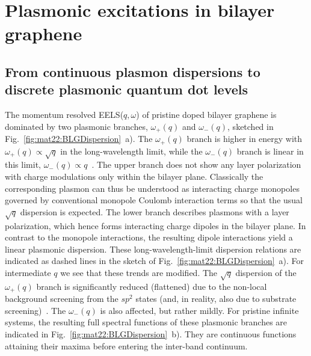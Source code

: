 
\section{Plasmonic excitations in bilayer graphene}

\subsection{From continuous plasmon dispersions to discrete plasmonic quantum dot levels}\label{sec:mat22:from-continuous-plasmon}
        
The momentum resolved EELS($q, \omega$) of pristine doped bilayer graphene is dominated by two plasmonic branches, $\omega_+(q)$ and $\omega_-(q)$, sketched in Fig.~\ref{fig:mat22:BLGDispersion}~a). The $\omega_+(q)$ branch is higher in energy with $\omega_+(q) \propto \sqrt{q}$ in the long-wavelength limit, while the $\omega_-(q)$ branch is linear in this limit, $\omega_-(q) \propto q$~\cite{hwang_dielectric_2007,hwang_plasmon_2009,roldan_dielectric_2013}. The upper branch does not show any layer polarization with charge modulations only within the bilayer plane. Classically the corresponding plasmon can thus be understood as interacting charge monopoles governed by conventional monopole Coulomb interaction terms so that the usual $\sqrt{q}$ dispersion is expected. The lower branch describes plasmons with a layer polarization, which hence forms interacting charge dipoles in the bilayer plane. In contrast to the monopole interactions, the resulting dipole interactions yield a linear plasmonic dispersion. These long-wavelength-limit dispersion relations are indicated as dashed lines in the sketch of Fig.~\ref{fig:mat22:BLGDispersion}~a). For intermediate $q$ we see that these trends are modified. The $\sqrt{q}$ dispersion of the $\omega_+(q)$ branch is significantly reduced (flattened) due to the non-local background screening from the $sp^2$ states (and, in reality, also due to substrate screening)~\cite{da_jornada_universal_2020,jiang_plasmonic_2021}. The $\omega_-(q)$ is also affected, but rather mildly. For pristine infinite systems, the resulting full spectral functions of these plasmonic branches are indicated in Fig.~\ref{fig:mat22:BLGDispersion}~b). They are continuous functions attaining their maxima before entering the inter-band continuum.
        
